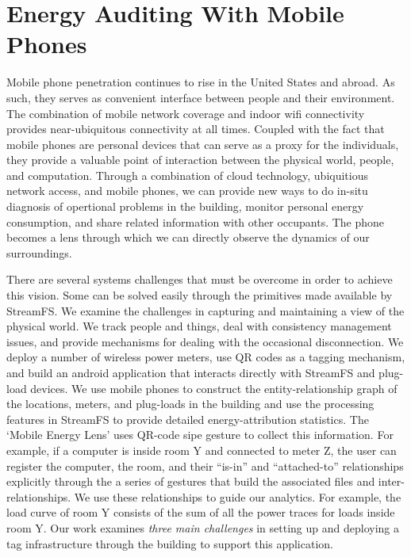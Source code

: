 \section{Energy Auditing With Mobile Phones} 
\label{sec:mobileaudit}

Mobile phone penetration continues to rise in the United States and abroad.
As such, they serves as convenient interface between people and their environment.  
The combination of mobile network coverage and indoor wifi connectivity provides near-ubiquitous
connectivity at all times.  Coupled with the fact that mobile phones are personal devices that can serve as a proxy 
for the individuals, they provide a valuable point of interaction between the physical world, people, and
computation.  Through a combination of cloud technology, ubiquitious network access, and mobile phones, 
we can provide new ways to do in-situ diagnosis of opertional problems in the building, monitor personal energy consumption, 
and share related information with other occupants.  The phone becomes a lens through which we can directly observe the dynamics 
of our surroundings.

There are several systems challenges that must be overcome in order to achieve this vision.  Some can be solved easily 
through the primitives made available by StreamFS.  
We examine the challenges in capturing and maintaining a view of the physical world.  We track people and things,
deal with consistency management issues, and provide mechanisms for dealing with the occasional disconnection.
We deploy a number of
wireless power meters, use QR codes as a tagging mechanism, and build an android application that interacts directly with
StreamFS and plug-load devices.
We use mobile phones to construct the entity-relationship 
graph of the locations, meters, and plug-loads in the building and use the processing features in StreamFS to provide detailed energy-attribution
statistics.  The `Mobile Energy Lens' uses QR-code sipe gesture to collect this information.  For example, if a computer is inside 
room Y and connected to meter Z, the user can register the computer, the room, and their ``is-in'' and ``attached-to'' relationships
explicitly through the a series of gestures that build the associated files and inter-relationships.  
We use these relationships to guide our analytics.
For example, the load curve of room Y consists of the sum of all the power traces for loads
inside room Y.  Our work examines \emph{three main challenges} in setting up and deploying a tag infrastructure through the building to 
support this application.


